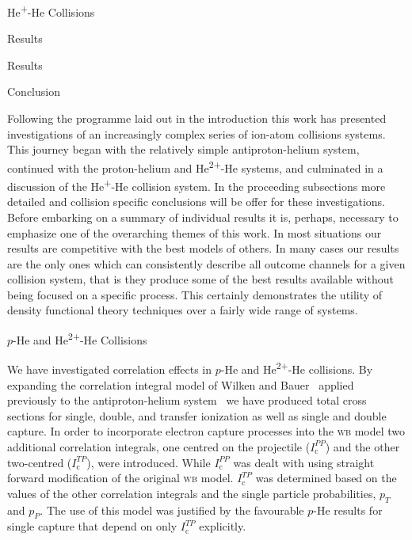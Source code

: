 \documentclass[letterpaper, 11 pt]{report}
\begin{document}
\begin{chapter}{\texorpdfstring{He\textsuperscript{+}}{He+}-He Collisions \label{chap:hephe}}
\begin{section}{Results \label{sec:hephe-disc}}
\begin{subsection}{Results \label{sec:hephe-res}}
      \end{subsection}

   \end{section}

\end{chapter}

\begin{chapter}{Conclusion \label{chap:con}}

   Following the programme laid out in the introduction this work has presented investigations of an
   increasingly complex series of ion-atom collisions systems. This journey began with the relatively
   simple antiproton-helium system, continued with the proton-helium and He\textsuperscript{2+}-He
   systems, and culminated in a discussion of the He\textsuperscript{+}-He collision system. In the
   proceeding subsections more detailed and collision specific conclusions will be offer for these
   investigations. Before embarking on a summary of individual results it is, perhaps, necessary to
   emphasize one of the overarching themes of this work. In most situations our results are competitive
   with the best models of others. In many cases our results are the only ones which can consistently
   describe all outcome channels for a given collision system, that is they produce some of the best
   results available without being focused on a specific process. This certainly demonstrates the
   utility of density functional theory techniques over a fairly wide range of systems.

   \begin{section}{\texorpdfstring{$p$}{p}-He and \texorpdfstring{He\textsuperscript{2+}}{He2+}-He
                   Collisions \label{sec:con-phe2p-he}}

      We have investigated correlation effects in $p$-He and He\textsuperscript{2+}-He collisions. By
      expanding the correlation integral model of Wilken and Bauer~\cite{wb} applied previously to the
      antiproton-helium system~\cite{pbarhe} we have produced total cross sections for single, double,
      and transfer ionization as well as single and double capture. In order to incorporate electron
      capture processes into the \textsc{wb} model two additional correlation integrals, one centred on
      the projectile ($I^{PP}_\mathrm{c}$) and the other two-centred ($I^{TP}_\mathrm{c}$), were
      introduced. While $I^{PP}_\mathrm{c}$ was dealt with using straight forward modification of the
      original \textsc{wb} model. $I^{TP}_\mathrm{c}$ was determined based on the values of the other
      correlation integrals and the single particle probabilities, $p_T$ and $p_P$. The use of this
      model was justified by the favourable $p$-He results for single capture that depend on only
      $I^{TP}_\mathrm{c}$ explicitly.


\end{section}
\end{chapter}
\end{document}

